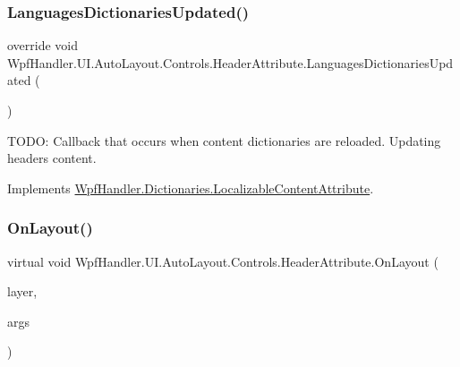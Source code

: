 \subsubsection{\texorpdfstring{Languages\+Dictionaries\+Updated()}{LanguagesDictionariesUpdated()}}
{\footnotesize\ttfamily override void Wpf\+Handler.\+U\+I.\+Auto\+Layout.\+Controls.\+Header\+Attribute.\+Languages\+Dictionaries\+Updated (\begin{DoxyParamCaption}{ }\end{DoxyParamCaption})\hspace{0.3cm}{\ttfamily [virtual]}}



T\+O\+DO\+: Callback that occurs when content dictionaries are reloaded. Updating header\textquotesingle{}s content. 



Implements \mbox{\hyperlink{class_wpf_handler_1_1_dictionaries_1_1_localizable_content_attribute_a001e110c7ad42422bc02a44d9eedc801}{Wpf\+Handler.\+Dictionaries.\+Localizable\+Content\+Attribute}}.

\mbox{\label{class_wpf_handler_1_1_u_i_1_1_auto_layout_1_1_controls_1_1_header_attribute_a837805f9b975447e7cf5663119189c37}} 
\subsubsection{\texorpdfstring{On\+Layout()}{OnLayout()}}
{\footnotesize\ttfamily virtual void Wpf\+Handler.\+U\+I.\+Auto\+Layout.\+Controls.\+Header\+Attribute.\+On\+Layout (\begin{DoxyParamCaption}\item[{ref \mbox{\hyperlink{class_wpf_handler_1_1_u_i_1_1_auto_layout_1_1_layout_layer}{Layout\+Layer}}}]{layer,  }\item[{params object \mbox{[}$\,$\mbox{]}}]{args }\end{DoxyParamCaption})\hspace{0.3cm}{\ttfamily [virtual]}}



